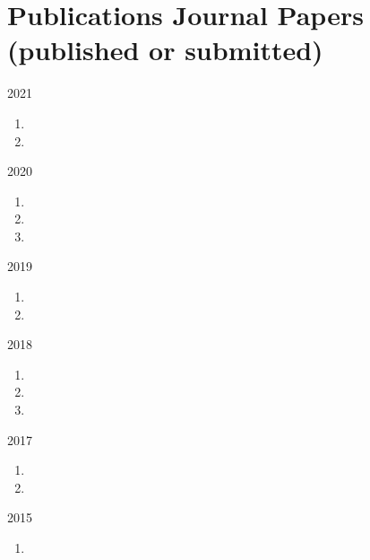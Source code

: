 \section*{Publications {\small Journal Papers (published or submitted)}}

\begin{paracol}{2}
  2021
\switchcolumn
  \begin{enumerate}
    \item {}
    \item {}
    \setcounter{pubcounter}{\theenumi}
  \end{enumerate}
\end{paracol}

\begin{paracol}{2}
  2020
\switchcolumn
  \begin{enumerate}
    \setcounter{enumi}{\thepubcounter}
    \item {}
    \item {}
    \item {}
    \setcounter{pubcounter}{\theenumi}
  \end{enumerate}
\end{paracol}

\begin{paracol}{2}
  2019
\switchcolumn
  \begin{enumerate}
    \setcounter{enumi}{\thepubcounter}
    \item {}
    \item {}
    \setcounter{pubcounter}{\theenumi}
  \end{enumerate}
\end{paracol}

\begin{paracol}{2}
  2018
\switchcolumn
  \begin{enumerate}
    \setcounter{enumi}{\thepubcounter}
    \item {}
    \item {}
    \item {}
    \setcounter{pubcounter}{\theenumi}
  \end{enumerate}
\end{paracol}

\begin{paracol}{2}
  2017
\switchcolumn
  \begin{enumerate}
    \setcounter{enumi}{\thepubcounter}
    \item {}
    \item {}
    \setcounter{pubcounter}{\theenumi}
  \end{enumerate}
\end{paracol}

\begin{paracol}{2}
  2015
\switchcolumn
  \begin{enumerate}
    \setcounter{enumi}{\thepubcounter}
    \item {}
    \setcounter{pubcounter}{\theenumi}
  \end{enumerate}
\end{paracol}
